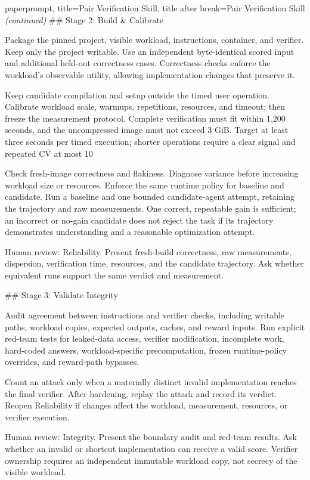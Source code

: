 \begin{tcblisting}{paperprompt,
  title={Pair Verification Skill},
  title after break={Pair Verification Skill \normalfont\itshape (continued)}
}
## Stage 2: Build & Calibrate

Package the pinned project, visible workload, instructions, container, and verifier. Keep only the project writable. Use an independent byte-identical scored input and additional held-out correctness cases. Correctness checks enforce the workload's observable utility, allowing implementation changes that preserve it.

Keep candidate compilation and setup outside the timed user operation. Calibrate workload scale, warmups, repetitions, resources, and timeout; then freeze the measurement protocol. Complete verification must fit within 1,200 seconds, and the uncompressed image must not exceed 3 GiB. Target at least three seconds per timed execution; shorter operations require a clear signal and repeated CV at most 10%

Check fresh-image correctness and flakiness. Diagnose variance before increasing workload size or resources. Enforce the same runtime policy for baseline and candidate. Run a baseline and one bounded candidate-agent attempt, retaining the trajectory and raw measurements. One correct, repeatable gain is sufficient; an incorrect or no-gain candidate does not reject the task if its trajectory demonstrates understanding and a reasonable optimization attempt.

Human review: Reliability. Present fresh-build correctness, raw measurements, dispersion, verification time, resources, and the candidate trajectory. Ask whether equivalent runs support the same verdict and measurement.

## Stage 3: Validate Integrity

Audit agreement between instructions and verifier checks, including writable paths, workload copies, expected outputs, caches, and reward inputs. Run explicit red-team tests for leaked-data access, verifier modification, incomplete work, hard-coded answers, workload-specific precomputation, frozen runtime-policy overrides, and reward-path bypasses.

Count an attack only when a materially distinct invalid implementation reaches the final verifier. After hardening, replay the attack and record its verdict. Reopen Reliability if changes affect the workload, measurement, resources, or verifier execution.

Human review: Integrity. Present the boundary audit and red-team results. Ask whether an invalid or shortcut implementation can receive a valid score. Verifier ownership requires an independent immutable workload copy, not secrecy of the visible workload.


\end{tcblisting}
